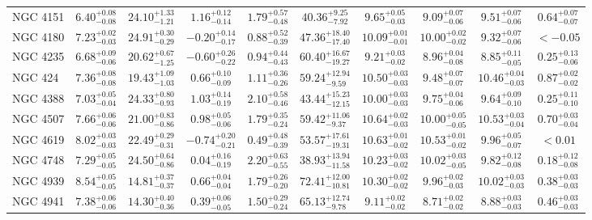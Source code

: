 \documentclass[onecolumn]{mn2e}
\begin{document}
\begin{landscape}
{\begin{center}
\begin{longtable}{lccccccccc}
NGC 4151 & $6.40_{-0.08}^{+0.08}$ & $24.10_{-1.21}^{+1.33}$ & $1.16_{-0.14}^{+0.12}$ & $1.79_{-0.48}^{+0.57}$ &$40.36_{-7.92}^{+9.25}$ & $9.65_{-0.03}^{+0.05}$ & $9.09_{-0.06}^{+0.07}$ & $9.51_{-0.06}^{+0.07}$ & $0.64_{-0.07}^{+0.07}$ \\
NGC 4180 & $7.23_{-0.03}^{+0.02}$ & $24.91_{-0.29}^{+0.30}$ & $-0.20_{-0.17}^{+0.14}$ & $0.88_{-0.39}^{+0.52}$ &$47.36_{-17.40}^{+18.40}$ & $10.09_{-0.01}^{+0.01}$ & $10.00_{-0.02}^{+0.02}$ & $9.32_{-0.06}^{+0.07}$ & $<-0.05$ \\
NGC 4235 & $6.68_{-0.06}^{+0.09}$ & $20.62_{-1.25}^{+0.67}$ & $-0.60_{-0.22}^{+0.26}$ & $0.94_{-0.43}^{+0.44}$ &$60.40_{-19.27}^{+16.67}$ & $9.21_{-0.02}^{+0.03}$ & $8.96_{-0.08}^{+0.04}$ & $8.85_{-0.05}^{+0.11}$ & $0.25_{-0.06}^{+0.13}$ \\
NGC 424 & $7.36_{-0.08}^{+0.08}$ & $19.43_{-1.03}^{+1.09}$ & $0.66_{-0.09}^{+0.10}$ & $1.11_{-0.26}^{+0.36}$ &$59.24_{-9.59}^{+12.94}$ & $10.50_{-0.03}^{+0.03}$ & $9.48_{-0.07}^{+0.07}$ & $10.46_{-0.03}^{+0.04}$ & $0.87_{-0.02}^{+0.02}$ \\
NGC 4388 & $7.03_{-0.04}^{+0.05}$ & $24.33_{-0.93}^{+0.80}$ & $1.03_{-0.19}^{+0.14}$ & $2.10_{-0.46}^{+0.58}$ &$43.44_{-12.15}^{+15.23}$ & $10.00_{-0.03}^{+0.03}$ & $9.75_{-0.06}^{+0.04}$ & $9.64_{-0.10}^{+0.09}$ & $0.25_{-0.10}^{+0.11}$ \\
NGC 4507 & $7.66_{-0.06}^{+0.06}$ & $21.00_{-0.86}^{+0.83}$ & $0.98_{-0.06}^{+0.05}$ & $1.79_{-0.24}^{+0.35}$ &$59.42_{-9.37}^{+11.06}$ & $10.64_{-0.03}^{+0.02}$ & $10.00_{-0.05}^{+0.05}$ & $10.53_{-0.04}^{+0.03}$ & $0.70_{-0.04}^{+0.03}$ \\
NGC 4619 & $8.02_{-0.03}^{+0.03}$ & $22.49_{-0.31}^{+0.29}$ & $-0.74_{-0.21}^{+0.20}$ & $0.49_{-0.39}^{+0.48}$ &$53.57_{-19.31}^{+17.61}$ & $10.63_{-0.02}^{+0.01}$ & $10.53_{-0.02}^{+0.01}$ & $9.96_{-0.07}^{+0.05}$ & $<0.01$ \\
NGC 4748 & $7.29_{-0.05}^{+0.05}$ & $24.50_{-0.86}^{+0.64}$ & $0.04_{-0.19}^{+0.16}$ & $2.20_{-0.55}^{+0.63}$ &$38.93_{-11.58}^{+13.94}$ & $10.23_{-0.02}^{+0.03}$ & $10.02_{-0.05}^{+0.03}$ & $9.82_{-0.08}^{+0.12}$ & $0.18_{-0.08}^{+0.12}$ \\
NGC 4939 & $8.54_{-0.05}^{+0.05}$ & $14.81_{-0.37}^{+0.37}$ & $0.66_{-0.04}^{+0.04}$ & $1.79_{-0.20}^{+0.26}$ &$72.41_{-10.81}^{+12.00}$ & $10.30_{-0.02}^{+0.02}$ & $9.96_{-0.03}^{+0.02}$ & $10.02_{-0.03}^{+0.03}$ & $0.38_{-0.03}^{+0.03}$ \\
NGC 4941 & $7.38_{-0.06}^{+0.06}$ & $14.30_{-0.36}^{+0.40}$ & $0.39_{-0.05}^{+0.06}$ & $1.50_{-0.24}^{+0.29}$ &$65.13_{-9.78}^{+12.74}$ & $9.11_{-0.02}^{+0.02}$ & $8.71_{-0.02}^{+0.02}$ & $8.88_{-0.03}^{+0.03}$ & $0.46_{-0.03}^{+0.03}$ \\

\end{longtable}
\end{center}}
\end{landscape}
\end{document}
